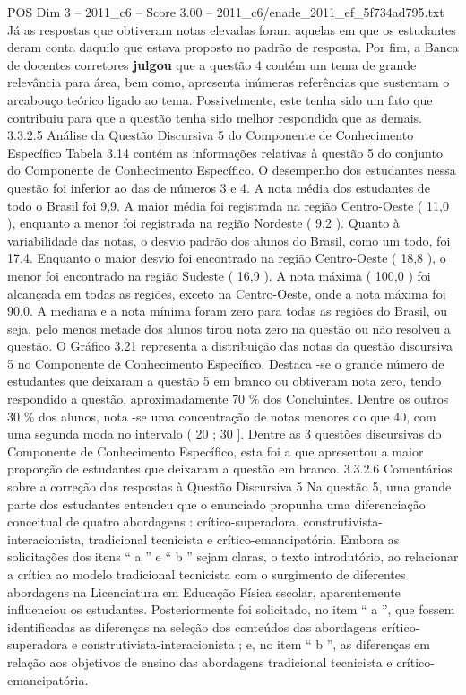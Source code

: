 \begin{textsample}{POS Dim 3 – 2011\_c6 – Score 3.00 – 2011\_c6/enade\_2011\_ef\_5f734ad795.txt}
Já as respostas que obtiveram notas elevadas foram aquelas em que os estudantes deram conta daquilo que estava proposto no padrão de resposta.
Por fim, a Banca de docentes corretores \textbf{julgou} que a questão 4 contém um tema de grande relevância para área, bem como, apresenta inúmeras referências que sustentam o arcabouço teórico ligado ao tema.
Possivelmente, este tenha sido um fato que contribuiu para que a questão tenha sido melhor respondida que as demais. 3.3.2.5 Análise da Questão Discursiva 5 do Componente de Conhecimento Específico Tabela 3.14 contém as informações relativas à questão 5 do conjunto do Componente de Conhecimento Específico.
O desempenho dos estudantes nessa questão foi inferior ao das de números 3 e 4.
A nota média dos estudantes de todo o Brasil foi 9,9.
A maior média foi registrada na região Centro-Oeste ( 11,0 ), enquanto a menor foi registrada na região Nordeste ( 9,2 ).
Quanto à variabilidade das notas, o desvio padrão dos alunos do Brasil, como um todo, foi 17,4.
Enquanto o maior desvio foi encontrado na região Centro-Oeste ( 18,8 ), o menor foi encontrado na região Sudeste ( 16,9 ).
A nota máxima ( 100,0 ) foi alcançada em todas as regiões, exceto na Centro-Oeste, onde a nota máxima foi 90,0.
A mediana e a nota mínima foram zero para todas as regiões do Brasil, ou seja, pelo menos metade dos alunos tirou nota zero na questão ou não resolveu a questão.
O Gráfico 3.21 representa a distribuição das notas da questão discursiva 5 no Componente de Conhecimento Específico.
Destaca -se o grande número de estudantes que deixaram a questão 5 em branco ou obtiveram nota zero, tendo respondido a questão, aproximadamente 70 \% dos Concluintes.
Dentre os outros 30 \% dos alunos, nota -se uma concentração de notas menores do que 40, com uma segunda moda no intervalo ( 20 ; 30 ].
Dentre as 3 questões discursivas do Componente de Conhecimento Específico, esta foi a que apresentou a maior proporção de estudantes que deixaram a questão em branco. 3.3.2.6 Comentários sobre a correção das respostas à Questão Discursiva 5 Na questão 5, uma grande parte dos estudantes entendeu que o enunciado propunha uma diferenciação conceitual de quatro abordagens : crítico-superadora, construtivista-interacionista, tradicional tecnicista e crítico-emancipatória.
Embora as solicitações dos itens “ a ” e “ b ” sejam claras, o texto introdutório, ao relacionar a crítica ao modelo tradicional tecnicista com o surgimento de diferentes abordagens na Licenciatura em Educação Física escolar, aparentemente influenciou os estudantes.
Posteriormente foi solicitado, no item “ a ”, que fossem identificadas as diferenças na seleção dos conteúdos das abordagens crítico-superadora e construtivista-interacionista ; e, no item “ b ”, as diferenças em relação aos objetivos de ensino das abordagens tradicional tecnicista e crítico-emancipatória.

\end{textsample}
